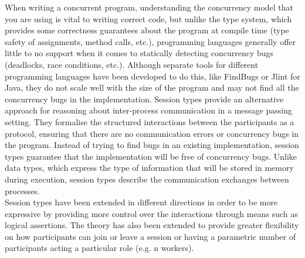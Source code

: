 \documentclass[12pt,twoside]{report}
\newcommand{\comment}[1]{}
\begin{document}
When writing a concurrent program, understanding the concurrency model that you are using is vital to writing correct code, but unlike the type system, which provides some correctness guarantees about the program at compile time (type safety of assignments, method calls, etc.), programming languages generally offer little to no support when it comes to statically detecting concurrency bugs (deadlocks, race conditions, etc.). Although separate tools for different programming languages have been developed to do this, like FindBugs\cite{FindBugs} or Jlint\cite{JLint} for Java\comment{How Good is Static Analysis at Finding Concurrency Bugs?/Find Bugs paper and chord paper}, they do not scale well with the size of the program and may not find all the concurrency bugs in the implementation\cite{ConcurrencyTools}. Session types\cite{binarysessiontypes1} provide an alternative approach for reasoning about inter-process communication in a message passing setting. They formalise the structured interactions between the participants as a protocol, ensuring that there are no communication errors or concurrency bugs in the program. Instead of trying to find bugs in an existing implementation, session types guarantee that the implementation will be free of concurrency bugs. Unlike data types, which express the type of information that will be stored in memory during execution, session types describe the communication exchanges between processes.\\

Session types have been extended in different directions in order to be more expressive by providing more control over the interactions through means such as logical assertions\cite{logicaassertions}. The theory has also been extended to provide greater flexibility on how participants can join or leave a session\cite{multirolesessiontypes} or having a parametric number of participants acting a particular role (e.g. n workers)\cite{parametrictypes}.\\
\end{document}

